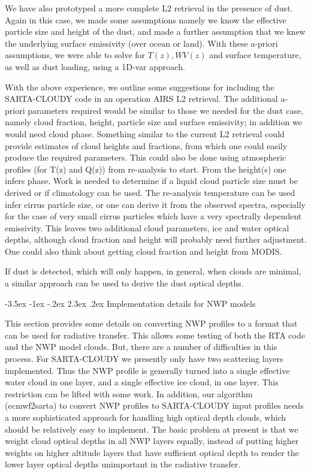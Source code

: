 \documentclass[11pt]{article}
\makeatletter
\newcommand{\sasc}{\textsf{SARTA-CLOUDY}\xspace}
\renewcommand{\section}{\@startsection {section}{1}{\z@}%
                                   {-3.5ex \@plus -1ex \@minus -.2ex}%
                                   {2.3ex \@plus.2ex}%
                                   {\reset@font\large\bfseries}}
\makeatother
\begin{document}
We have also prototyped a more complete L2 retrieval in the presence
of dust. Again in this case, we made some assumptions namely we know
the effective particle size and height of the dust, and made a further
assumption that we knew the underlying surface emissivity (over ocean
or land). With these a-priori assumptions, we were able to solve for
$T(z),WV(z)$ and surface temperature, as well as dust loading, using a
1D-var approach.

With the above experience, we outline some suggestions for including
the \sasc code in an operation AIRS L2 retrieval.  The additional
a-priori parameters required would be similar to those we needed for
the dust case, namely cloud fraction, height, particle size and
surface emissivity; in addition we would need cloud phase. Something
similar to the current L2 retrieval could provide estimates of cloud
heights and fractions, from which one could easily produce the
required parameters. This could also be done using atmospheric
profiles (for T(z) and Q(z)) from re-analysis to start.  From the
height(s) one infers phase.  Work is needed to determine if a liquid
cloud particle size must be derived or if climatology can be used.
The re-analysis temperature can be used infer cirrus particle size, or
one can derive it from the observed spectra, especially for the case
of very small cirrus particles which have a very spectrally dependent
emissivity.  This leaves two additional cloud parameters, ice and
water optical depths, although cloud fraction and height will probably
need further adjustment.  One could also think about getting cloud
fraction and height from MODIS.

If dust is detected, which will only happen, in general, when clouds
are minimal, a similar approach can be used to derive the dust optical
depths. 

\section{Implementation details for NWP models}

This section provides some details on converting NWP profiles to a
format that can be used for radiative transfer.  This allows some
testing of both the RTA code and the NWP model clouds.  But, there are
a number of difficulties in this process.  For \sasc we presently only
have two scattering layers implemented.  Thus the NWP profile is
generally turned into a single effective water cloud in one layer, and
a single effective ice cloud, in one layer.  This restriction can be
lifted with some work.  In addition, our algorithm
(\textsf{ecmwf2sarta}) to convert NWP profiles to \sasc input profiles
needs a more sophisticated approach for handling high optical depth
clouds, which should be relatively easy to implement.  The basic
problem at present is that we weight cloud optical depths in all NWP
layers equally, instead of putting higher weights on higher altitude
layers that have sufficient optical depth to render the lower layer
optical depths unimportant in the radiative transfer.
\end{document}
